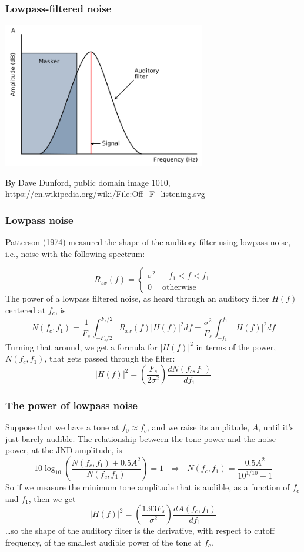 \begin{frame}
  \frametitle{Lowpass-filtered noise}

  \centerline{\includegraphics[height=2.5in]{Off_F_listening.png}}
  \begin{tiny}
    By Dave Dunford, public domain image 1010,
    \url{https://en.wikipedia.org/wiki/File:Off_F_listening.svg}
  \end{tiny}
\end{frame}

\begin{frame}
  \frametitle{Lowpass noise}

  Patterson (1974) measured the shape of the auditory filter using
  lowpass noise, i.e., noise with the following spectrum:

  \[
  R_{xx}(f)  =\begin{cases}
  \sigma^2 & -f_1 < f<f_1\\ 0&\mbox{otherwise}
  \end{cases}
  \]
  The power of a lowpass filtered noise, as heard through
  an auditory filter $H(f)$ centered at $f_c$, is
  \[
  N(f_c,f_1)= \frac{1}{F_s}\int_{-F_s/2}^{F_s/2} R_{xx}(f) |H(f)|^2 df
  = \frac{\sigma^2}{F_s}\int_{-f_1}^{f_1} |H(f)|^2 df
  \]
  Turning that around, we get a formula for $|H(f)|^2$ in terms of the
  power, $N(f_c,f_1)$, that gets passed through the filter:
  \[
  |H(f)|^2=\left(\frac{F_s}{2\sigma^2}\right)
  \frac{dN(f_c,f_1)}{df_1}
  \]
\end{frame}


\begin{frame}
  \frametitle{The power of lowpass noise}

  Suppose that we have a tone at $f_0\approx f_c$, and we raise its
  amplitude, $A$, until it's just barely audible.  The relationship between the
  tone power and the noise power, at the JND amplitude, is
  \[
  10\log_{10}\left(\frac{N(f_c,f_1)+0.5A^2}{N(f_c,f_1)}\right) = 1~~~\Rightarrow~~~
  N(f_c,f_1)= \frac{0.5A^2}{10^{1/10}-1}
  \]
  So if we measure the minimum tone amplitude that is audible, as a  function
  of $f_c$ and $f_1$, then we get 
  \[
  |H(f)|^2 = \left(\frac{1.93 F_s}{\sigma^2}\right)
  \frac{dA(f_c,f_1)}{df_1}
  \]
  \ldots so the shape of the auditory filter is the derivative, with respect to
  cutoff frequency, of the smallest audible power of the tone at $f_c$.
\end{frame}

